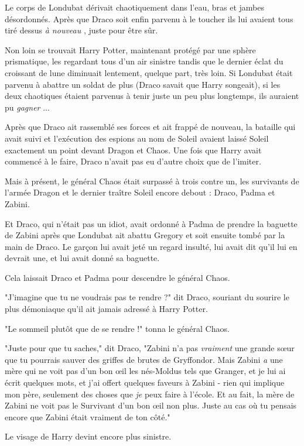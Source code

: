 Le corps de Londubat dérivait chaotiquement dans l'eau, bras et jambes désordonnés. Après que Draco soit enfin parvenu à le toucher ils lui avaient tous tiré dessus \emph{à nouveau} , juste pour être sûr.

Non loin se trouvait Harry Potter, maintenant protégé par une sphère prismatique, les regardant tous d'un air sinistre tandis que le dernier éclat du croissant de lune diminuait lentement, quelque part, très loin. Si Londubat était parvenu à abattre un soldat de plus (Draco savait que Harry songeait), si les deux chaotiques étaient parvenus à tenir juste un peu plus longtemps, ils auraient pu \emph{gagner} ...

Après que Draco ait rassemblé ses forces et ait frappé de nouveau, la bataille qui avait suivi et l'exécution des espions au nom de Soleil avaient laissé Soleil exactement un point devant Dragon et Chaos. Une fois que Harry avait commencé à le faire, Draco n'avait pas eu d'autre choix que de l'imiter.

Mais à présent, le général Chaos était surpassé à trois contre un, les survivants de l'armée Dragon et le dernier traître Soleil encore debout : Draco, Padma et Zabini.

Et Draco, qui n'était pas un idiot, avait ordonné à Padma de prendre la baguette de Zabini après que Londubat ait abattu Gregory et soit ensuite tombé par la main de Draco. Le garçon lui avait jeté un regard insulté, lui avait dit qu'il lui en devrait une, et lui avait donné sa baguette.

Cela laissait Draco et Padma pour descendre le général Chaos.

"J'imagine que tu ne voudrais pas te rendre ?" dit Draco, souriant du sourire le plus démoniaque qu'il ait jamais adressé à Harry Potter.

"Le sommeil plutôt que de se rendre !" tonna le général Chaos.

"Juste pour que tu saches," dit Draco, "Zabini n'a pas \emph{vraiment}  une grande sœur que tu pourrais sauver des griffes de brutes de Gryffondor. Mais Zabini \emph{a}  une mère qui ne voit pas d'un bon œil les nés-Moldus tels que Granger, et je lui ai écrit quelques mots, et j'ai offert quelques faveurs à Zabini - rien qui implique mon père, seulement des choses que \emph{je}  peux faire à l'école. Et au fait, la mère de Zabini ne voit pas le Survivant d'un bon œil non plus. Juste au cas où tu pensais encore que Zabini était vraiment de ton côté."

Le visage de Harry devint encore plus sinistre.

